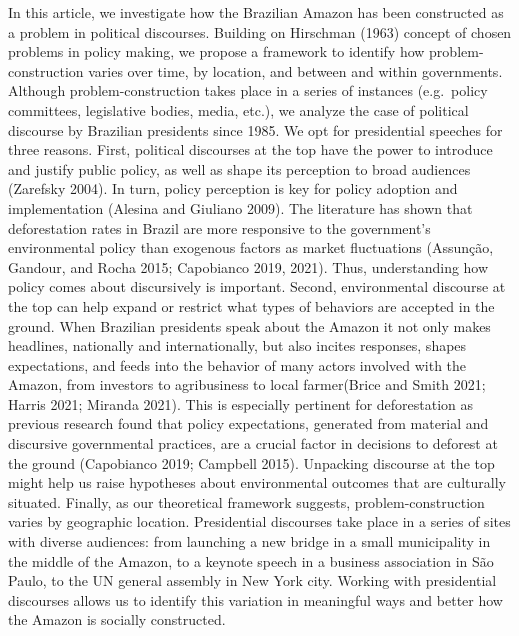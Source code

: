 \documentclass[
]{article}
\begin{document}
In this article, we investigate how the Brazilian Amazon has been
constructed as a problem in political discourses. Building on Hirschman
(1963) concept of chosen problems in policy making, we propose a
framework to identify how problem-construction varies over time, by
location, and between and within governments. Although
problem-construction takes place in a series of instances (e.g.~policy
committees, legislative bodies, media, etc.), we analyze the case of
political discourse by Brazilian presidents since 1985. We opt for
presidential speeches for three reasons. First, political discourses at
the top have the power to introduce and justify public policy, as well
as shape its perception to broad audiences (Zarefsky 2004). In turn,
policy perception is key for policy adoption and implementation (Alesina
and Giuliano 2009). The literature has shown that deforestation rates in
Brazil are more responsive to the government's environmental policy than
exogenous factors as market fluctuations (Assunção, Gandour, and Rocha
2015; Capobianco 2019, 2021). Thus, understanding how policy comes about
discursively is important. Second, environmental discourse at the top
can help expand or restrict what types of behaviors are accepted in the
ground. When Brazilian presidents speak about the Amazon it not only
makes headlines, nationally and internationally, but also incites
responses, shapes expectations, and feeds into the behavior of many
actors involved with the Amazon, from investors to agribusiness to local
farmer(Brice and Smith 2021; Harris 2021; Miranda 2021). This is
especially pertinent for deforestation as previous research found that
policy expectations, generated from material and discursive governmental
practices, are a crucial factor in decisions to deforest at the ground
(Capobianco 2019; Campbell 2015). Unpacking discourse at the top might
help us raise hypotheses about environmental outcomes that are
culturally situated. Finally, as our theoretical framework suggests,
problem-construction varies by geographic location. Presidential
discourses take place in a series of sites with diverse audiences: from
launching a new bridge in a small municipality in the middle of the
Amazon, to a keynote speech in a business association in São Paulo, to
the UN general assembly in New York city. Working with presidential
discourses allows us to identify this variation in meaningful ways and
better how the Amazon is socially constructed.
\end{document}
